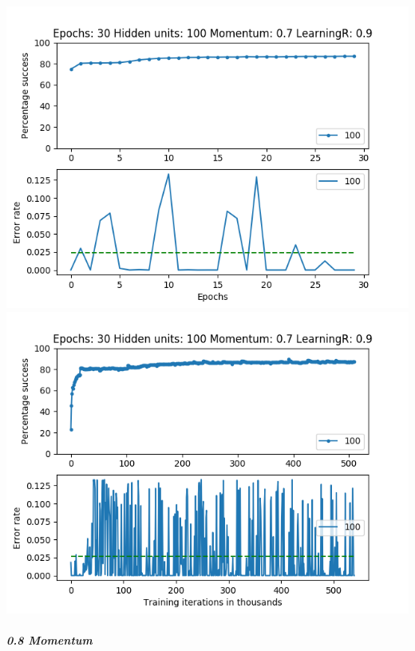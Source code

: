 \documentclass[11pt]{article}
\makeatletter
\def\maxwidth{\ifdim\Gin@nat@width>\linewidth\linewidth
    \else\Gin@nat@width\fi}
\let\Oldincludegraphics\includegraphics
\renewcommand{\includegraphics}[1]{\Oldincludegraphics[width=.8\maxwidth]{#1}}
\makeatother
\begin{document}
\includegraphics{Experiment2/E2_NN_Epoch_Momentum_0.7_30Epochs_100Hiddenunits.png}
\includegraphics{Experiment2/E2_NN_Training_Momentum_0.7_30Epochs_100Hiddenunits.png}

\hypertarget{momentum-8}{%
\subparagraph{0.8 Momentum}\label{momentum-8}}
\end{document}
